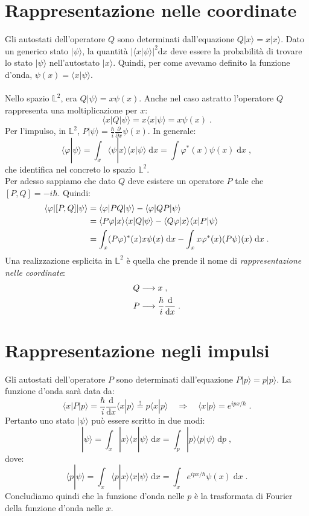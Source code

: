 \documentclass[10pt,a4paper]{report}
\theoremstyle{definition}
\numberwithin{equation}{section}
\newcommand{\diff}[1][]{\mathrm{d}#1}
\newcommand{\bra}{\langle}
\newcommand{\ket}{\rangle}
\begin{document}
\section{Rappresentazione nelle coordinate}
Gli autostati dell'operatore $Q$ sono determinati dall'equazione $Q|x\ket=x|x\ket$. Dato un generico stato $|\psi\ket$, la quantità $|\bra x|\psi\ket|^2\diff{x}$ deve essere la probabilità di trovare lo stato $|\psi\ket$ nell'autostato $|x\ket$.  Quindi, per come avevamo definito la funzione d'onda, $\psi(x)=\bra x|\psi\ket$. \\
\\
Nello spazio $\mathbb{L}^2$, era $Q|\psi\ket=x\psi(x)$. Anche nel caso astratto l'operatore $Q$ rappresenta una moltiplicazione per $x$:
\begin{equation}
\bra x|Q|\psi\ket=x\bra x|\psi\ket=x\psi(x)\;.
\end{equation}
Per l'impulso, in $\mathbb{L}^2$, $P|\psi\ket=\frac{\hbar}{i}\frac{\partial}{\partial x}\psi(x)$. In generale:
\begin{equation}
\bra \varphi|\psi\ket=\int_x \bra\psi|x\ket\bra x|\psi\ket\;\diff{x}=\int \varphi^*(x)\psi(x)\;\diff{x}\;,
\end{equation}
che identifica nel concreto lo spazio $\mathbb{L}^2$. \\
Per adesso sappiamo che dato $Q$ deve esistere un operatore $P$ tale che $[P,Q]=-i\hbar$. Quindi:
\begin{align}
\bra\varphi|[P,Q]|\psi\ket &= \bra\varphi|PQ|\psi\ket-\bra\varphi|QP|\psi\ket \notag \\
&= \bra P\varphi|x\ket\bra x|Q|\psi\ket- \bra Q\varphi|x\ket\bra x|P|\psi\ket \notag \\
&= \int_x (P\varphi)^*(x)x\psi(x)\;\diff{x}-\int_x x\varphi^*(x)(P\psi)(x)\;\diff{x}\;.
\end{align}
Una realizzazione esplicita in $\mathbb{L}^2$ è quella che prende il nome di \textit{rappresentazione nelle coordinate}:
\begin{align}
Q &\longrightarrow x \notag\;, \\
P &\longrightarrow \frac{\hbar}{i}\frac{\diff}{\diff{x}}\;.
\end{align}
\section{Rappresentazione negli impulsi}
Gli autostati dell'operatore $P$ sono determinati dall'equazione $P|p\ket=p|p\ket$. La funzione d'onda sarà data da:
\begin{equation}
\bra x|P|p\ket=\frac{\hbar}{i}\frac{\diff}{\diff{x}}\bra x|p\ket\stackrel{!}{=} p\bra x|p\ket \quad \Longrightarrow \quad \bra x|p\ket=e^{ipx/\hbar}\;.
\end{equation}
Pertanto uno stato $|\psi\ket$ può essere scritto in due modi:
$$
|\psi\ket=\int_x |x\ket\bra x|\psi\ket\;\diff{x}=\int_p |p\ket\bra p|\psi\ket\;\diff{p}\;,
$$
dove:
\begin{equation}
\bra p|\psi\ket=\int_x \bra p|x\ket\bra x|\psi\ket\;\diff{x}=\int_x e^{ipx/\hbar}\psi(x)\;\diff{x}\;.
\end{equation}
Concludiamo quindi che la funzione d'onda nelle $p$ è la trasformata di Fourier della funzione d'onda nelle $x$.
\end{document}
